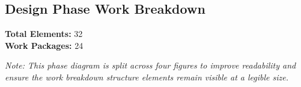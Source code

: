 
\subsection{Design Phase Work Breakdown}

\noindent\textbf{Total Elements:} 32
\\\textbf{Work Packages:} 24

\vspace{0.5em}

\noindent\textit{Note: This phase diagram is split across four figures to improve readability and ensure the work breakdown structure elements remain visible at a legible size.}



\newpage


\newpage


\newpage


